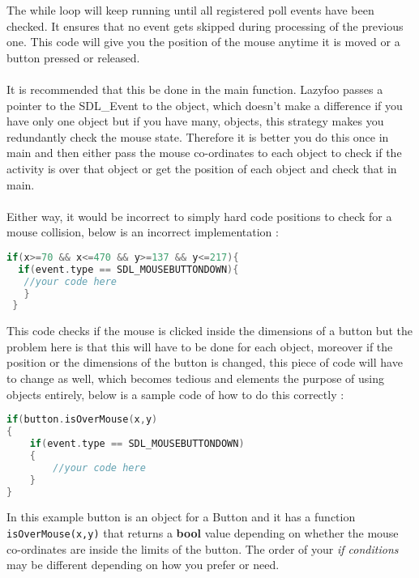 \documentclass[11pt,fleqn]{book} %
\begin{document}
The while loop will keep running until all registered poll events have been checked. It ensures that no event gets skipped during processing of the previous one. This code will give you the position of the mouse anytime it is moved or a button pressed or released. \\ \\
It is recommended that this be done in the main function. Lazyfoo passes a pointer to the SDL\_Event to the object, which doesn't make a difference if you have only one object but if you have many, objects, this strategy makes you redundantly check the mouse state. Therefore it is better you do this once in main and then either pass the mouse co-ordinates to each object to check if the activity is over that object or get the position of each object and check that in main. \\ \\
Either way, it would be incorrect to simply hard code positions to check for a mouse collision, below is an incorrect implementation :
\begin{lstlisting}[language=C++, caption=Checking incorrectly if a button is pressed ]
if(x>=70 && x<=470 && y>=137 && y<=217){
  if(event.type == SDL_MOUSEBUTTONDOWN){
   //your code here
   }
 }
\end{lstlisting}
This code checks if the mouse is clicked inside the dimensions of a button but the problem here is that this will have to be done for each object, moreover if the position or the dimensions of the button is changed, this piece of code will have to change as well, which becomes tedious and elements the purpose of using objects entirely, below is a sample code of how to do this correctly :
\begin{lstlisting}[language=C++, caption=Checking correctly if a button is pressed ]
if(button.isOverMouse(x,y)
{
  	if(event.type == SDL_MOUSEBUTTONDOWN)
    {
    	//your code here
    }
}
\end{lstlisting}
In this example button is an object for a Button and it has a function \texttt{isOverMouse(x,y)} that returns a \textbf{bool} value depending on whether the mouse co-ordinates are inside the limits of the button.\newline
The order of your \textit{if conditions} may be different depending on how you prefer or need.
    
    
\end{document}
